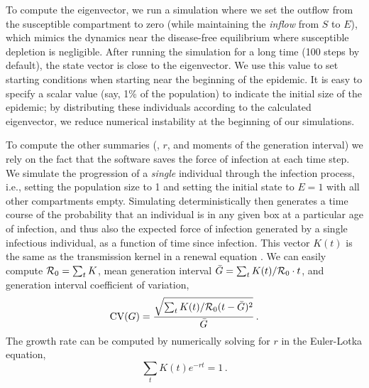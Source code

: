 \documentclass[12pt]{article}\usepackage[]{graphicx}\usepackage[]{color}
\begin{document}
To compute the eigenvector, we run a simulation where we set the outflow from the susceptible compartment to zero (while maintaining the \emph{inflow} from $S$ to $E$), which mimics the dynamics near the disease-free equilibrium where susceptible depletion is negligible. After running the simulation for a long time (100 steps by default), the state vector is close to the eigenvector.  
We use this value to set starting conditions when starting near the beginning of the epidemic. 
It is easy to specify a scalar value (say, 1\% of the population) to indicate the initial size of the epidemic; by distributing these individuals according to the calculated eigenvector, we reduce numerical instability at the beginning of our simulations. 

To compute the other summaries (\Rzero, $r$, and moments of the generation interval) we rely on the fact that the software saves the force of infection at each time step. 
We simulate the progression of a \emph{single} individual through the infection process, i.e., setting the population size to 1 and setting the initial state to $E=1$ with all other compartments empty. 
Simulating deterministically then generates a time course of the probability that an individual is in any given box at a particular age of infection, and thus also the expected force of infection generated by a single infectious individual, as a function of time since infection. 
This vector $K(t)$ is the same as the transmission kernel in a renewal equation \cite{Cham+18}. 
We can easily compute ${\mathcal R}_0 = \sum_t K$, mean generation interval  $\bar G = \sum_t K(t)/{\mathcal R}_0 \cdot t$, and generation interval coefficient of variation,
\[
\textrm{CV}(G) = \frac{\sqrt{\sum_t K(t)/{\mathcal R}_0 (t- \bar G)^2}}{\bar G} \,.
\]
The growth rate can be computed by numerically solving for $r$ in the Euler-Lotka equation,
\[
\sum_t  K(t) e^{-r t} = 1 \,.
\]

\end{document}
